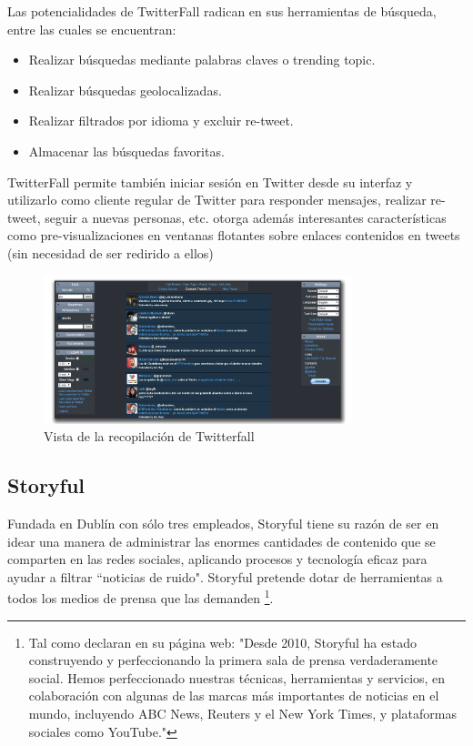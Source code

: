 Las potencialidades de TwitterFall radican en sus herramientas de búsqueda, entre las cuales se encuentran:
\begin{itemize}
	\item Realizar búsquedas mediante palabras claves o trending topic.
	\item Realizar búsquedas geolocalizadas.
	\item Realizar filtrados por idioma y excluir re-tweet.
	\item Almacenar las búsquedas favoritas.
\end{itemize}

TwitterFall permite también iniciar sesión en Twitter desde su interfaz y utilizarlo como cliente regular de Twitter para responder mensajes, realizar re-tweet, seguir a nuevas personas, etc. otorga además interesantes características como pre-visualizaciones en ventanas flotantes sobre enlaces contenidos en tweets (sin necesidad de ser redirido a ellos)



\begin{figure}[H]
	\centering
	\includegraphics[width=0.8\textwidth]{imgs/twitterfall.jpg}
	\caption{Vista de la recopilación de Twitterfall}
	\label{fig:twitterfall}
\end{figure}

\subsection{Storyful}

Fundada en Dublín con sólo tres empleados, Storyful \cite{storyful} tiene su razón de ser en idear una manera de administrar las enormes cantidades de contenido que se comparten en las redes sociales, aplicando procesos y tecnología eficaz para ayudar a filtrar ``noticias de ruido". Storyful pretende dotar de herramientas a todos los medios de prensa que las demanden \footnote{ Tal como declaran en su página web: "Desde 2010, Storyful ha estado construyendo y perfeccionando la primera sala de prensa verdaderamente social. Hemos perfeccionado nuestras técnicas, herramientas y servicios, en colaboración con algunas de las marcas más importantes de noticias en el mundo, incluyendo ABC News, Reuters y el New York Times, y plataformas sociales como YouTube." }.

